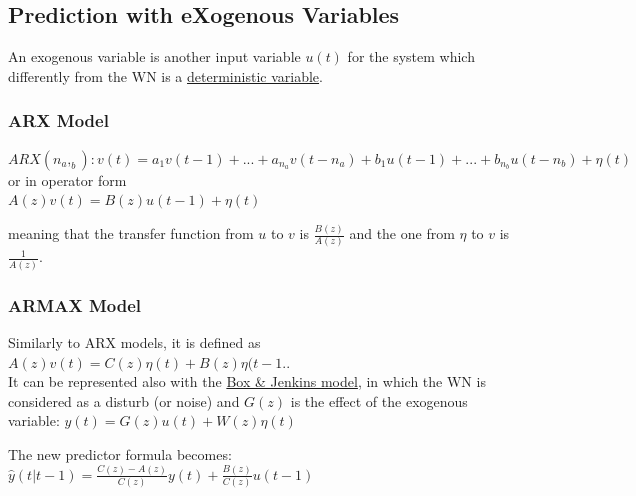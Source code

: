 \documentclass[10pt,a4paper]{article}
\begin{document}
\subsection{Prediction with eXogenous Variables}
An exogenous variable is another input variable $u(t)$ for the system which differently from the WN is a \uline{deterministic variable}.
\subsubsection{ARX Model}
\center $ARX(n_a,_b): v(t)=a_1v(t-1)+...+a_{n_a}v(t-n_a)+b_1u(t-1)+...+b_{n_b}u(t-n_b)+\eta(t)$ 
\\ \vspace{0.3em}
or in operator form
\\ \vspace{0.3em}
$A(z)v(t)=B(z)u(t-1)+\eta(t)$
\\ \raggedright \vspace{0.5em}
meaning that the transfer function from $u$ to $v$ is $\frac{B(z)}{A(z)}$ and the one from $\eta$ to $v$ is $\frac{1}{A(z)}$.
\subsubsection{ARMAX Model}
Similarly to ARX models, it is defined as $A(z)v(t)=C(z)\eta(t)+B(z)\eta(t-1.$. \\
It can be represented also with the \uline{Box \& Jenkins model}, in which the WN is considered as a disturb (or noise) and $G(z)$ is the effect of the exogenous variable: 
\center 
$y(t)=G(z)u(t)+W(z)\eta(t)$
\\ \raggedright \vspace{0.5em}
The new predictor formula becomes:
\center 
$\hat{y}(t|t-1)=\frac{C(z)-A(z)}{C(z)}y(t)+\frac{B(z)}{C(z)}u(t-1)$
\\ \raggedright
\end{document}
